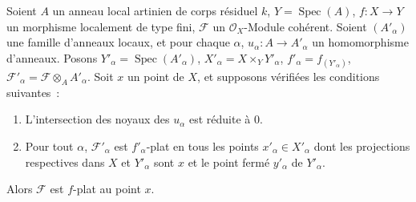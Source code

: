 \begin{proposition}[11.4.12]
\label{IV.11.4.12-fr}
Soient $A$ un anneau local artinien de corps résiduel $k$,
$Y=\operatorname{Spec}(A)$, $f:X\to Y$ un morphisme localement de type fini,
$\mathcal F$ un $\mathcal O_X$-Module cohérent. Soient $(A'_\alpha)$ une famille
d'anneaux locaux, et pour chaque $\alpha$, $u_\alpha:A\to A'_\alpha$ un
homomorphisme d'anneaux. Posons $Y'_\alpha=\operatorname{Spec}(A'_\alpha)$,
$X'_\alpha=X\times_Y Y'_\alpha$, $f'_\alpha=f_{(Y'_\alpha)}$,
$\mathcal F'_\alpha=\mathcal F\otimes_A A'_\alpha$. Soit $x$ un point de $X$,
et supposons vérifiées les conditions suivantes~:
\begin{enumerate}[label=(\roman*)]
  \item L'intersection des noyaux des $u_\alpha$ est réduite à $0$.
  \item Pour tout $\alpha$, $\mathcal F'_\alpha$ est $f'_\alpha$-plat en tous
  les points $x'_\alpha\in X'_\alpha$ dont les projections respectives dans
  $X$ et $Y'_\alpha$ sont $x$ et le point fermé $y'_\alpha$ de $Y'_\alpha$.
\end{enumerate}
Alors $\mathcal F$ est $f$-plat au point $x$.
\end{proposition}

